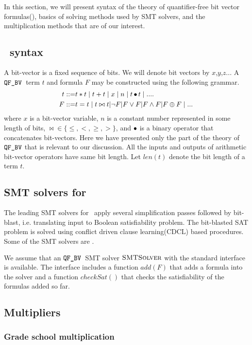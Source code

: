 In this section, we will present syntax of
the theory of quantifier-free bit vector formulas(\qfbv),
basics of solving methods used by SMT solvers,
and the multiplication methods that are of our interest. 

\subsection{\qfbv~syntax}

A bit-vector is a fixed sequence of bits.
%
We will denote bit vectors by $x$,$y$,$z$...
%
A $\texttt{QF\_BV}$~term $t$ and formula $F$ may be constructed using
the following grammar.
\begin{align*}
t ::= & t * t \mid t + t \mid x \mid n \mid t \mathop{\bullet} t \mid ....\\
F ::= & t = t \mid t \bowtie t | \lnot F | F \lor F | F \land F | F \oplus F \mid ... 
\end{align*}
where $x$ is a bit-vector variable, 
$n$ is a constant number represented in some length of bits,
$\bowtie \in \{\leq , <, \geq, > \}$, and
$\mathop{\bullet}$ is a binary operator that concatenates bit-vectors.
%
Here we have presented only the  part of the theory
of $\texttt{QF\_BV}$ that is relevant to our discussion.
%
All the inputs and outputs of arithmetic bit-vector operators 
have same bit length.
%
Let $len(t)$ denote the bit length of a term $t$.

\subsection{SMT solvers for \qfbv}

The leading SMT solvers for \qfbv~apply several simplification
passes followed by bit-blast, i.e. translating input to Boolean
satisfiability problem.
%
The bit-blasted SAT problem is solved using conflict driven clause
learning(CDCL) based procedures.
%
Some of the SMT solvers are \zthree.

We assume that an  $\texttt{QF\_BV}$~SMT solver $\textsc{SMTSolver}$ 
with the standard interface is available.
%
The interface includes a function $add(F)$ that adds a formula
into the solver and a function $checkSat()$ that checks the
satisfiability of the formulas added so far. 

\subsection{Multipliers}



\subsubsection{Grade school multiplication}

